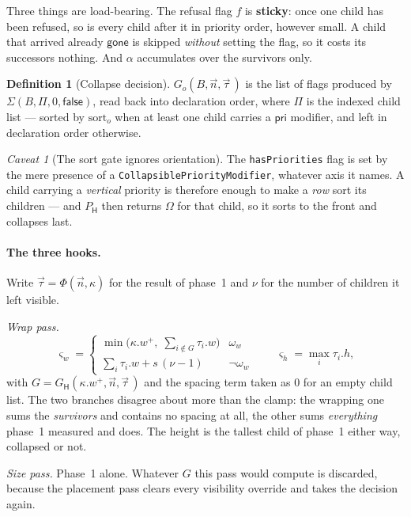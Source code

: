 \documentclass[11pt,a4paper]{article}
\newcommand{\Om}{\Omega}
\newcommand{\pri}{\mathsf{pri}}
\newcommand{\Horz}{\mathsf{H}}
\newcommand{\gone}{\mathsf{gone}}
\newcommand{\jv}[1]{\texttt{#1}}       %
\theoremstyle{definition}
\newtheorem{definition}{Definition}[section]
\theoremstyle{plain}
\theoremstyle{remark}
\newtheorem{warning}{Caveat}[section]
\begin{document}
Three things are load-bearing. The refusal flag $f$ is \textbf{sticky}: once one
child has been refused, so is every child after it in priority order, however
small. A child that arrived already $\gone$ is skipped \emph{without} setting the
flag, so it costs its successors nothing. And $\alpha$ accumulates over the
survivors only.

\begin{definition}[Collapse decision]
$G_o(B, \vec{n}, \vec{\tau}\,)$ is the list of flags produced by
$\Sigma(B, \Pi, 0, \textsf{false})$, read back into declaration order, where
$\Pi$ is the indexed child list --- sorted by $\mathrm{sort}_o$ when at least one
child carries a $\pri$ modifier, and left in declaration order otherwise.
\end{definition}

\begin{warning}[The sort gate ignores orientation]
The \jv{hasPriorities} flag is set by the mere presence of a
\jv{CollapsiblePriorityModifier}, whatever axis it names. A child carrying a
\emph{vertical} priority is therefore enough to make a \emph{row} sort its
children --- and $P_\Horz$ then returns $\Om$ for that child, so it sorts to the
front and collapses last.
\end{warning}

\paragraph{The three hooks.}
Write $\vec{\tau} = \Phi(\vec{n}, \kappa)$ for the result of phase~1 and $\nu$
for the number of children it left visible.

\emph{Wrap pass.}
\[
  \varsigma_w = \begin{cases}
    \min\bigl(\kappa.w^+,\; \sum_{i \notin G} \tau_i.w\bigr) & \omega_w \\[4pt]
    \sum_i \tau_i.w + s\,(\nu - 1) & \neg\omega_w
  \end{cases}
  \qquad
  \varsigma_h = \max_i \tau_i.h,
\]
with $G = G_\Horz(\kappa.w^+, \vec{n}, \vec{\tau}\,)$ and the spacing term taken
as $0$ for an empty child list. The two branches disagree about more than the
clamp: the wrapping one sums the \emph{survivors} and contains no spacing at all,
the other sums \emph{everything} phase~1 measured and does. The height is the
tallest child of phase~1 either way, collapsed or not.

\emph{Size pass.} Phase~1 alone. Whatever $G$ this pass would compute is
discarded, because the placement pass clears every visibility override and takes
the decision again.
\end{document}
